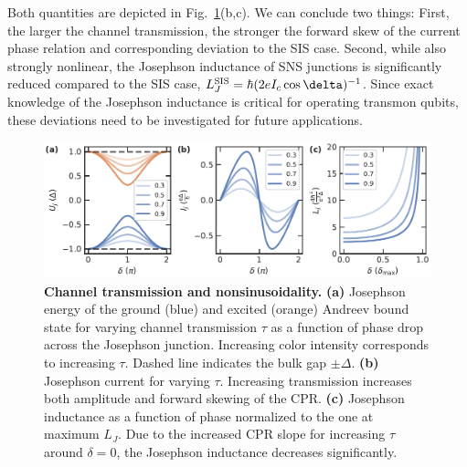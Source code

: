 Both quantities are depicted in Fig.~\ref{fig:modelsnsejic}(b,c).
%
We can conclude two things:
%
First, the larger the channel transmission, the stronger the forward skew of the current phase relation and corresponding deviation to the SIS case.
%
Second, while also strongly nonlinear, the Josephson inductance of SNS junctions is significantly reduced compared to the SIS case, $L_J^{\rm SIS}=\hbar(2eI_c\cos\delta)^{-1}$.
%
Since exact knowledge of the Josephson inductance is critical for operating transmon qubits, these deviations need to be investigated for future applications. 

\begin{figure}[t]
	\centering
	\includegraphics[width=\linewidth]{chapter-introduction/figs/model_SNS_EjIc}
	\caption{
		\textbf{Channel transmission and nonsinusoidality.}
		\textbf{(a)} Josephson energy of the ground (blue) and excited (orange) Andreev bound state for varying channel transmission $\tau$ as a function of phase drop across the Josephson junction.
		Increasing color intensity corresponds to increasing $\tau$.
		Dashed line indicates the bulk gap $\pm\Delta$.
		\textbf{(b)} Josephson current for varying $\tau$.
		Increasing transmission increases both amplitude and forward skewing of the CPR.
		\textbf{(c)} Josephson inductance as a function of phase normalized to the one at maximum $L_J$.
		Due to the increased CPR slope for increasing $\tau$ around $\delta=0$, the Josephson inductance decreases significantly.
	}
	\label{fig:modelsnsejic}
\end{figure}

